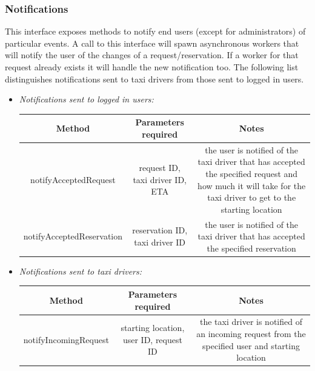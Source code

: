 \documentclass{article}
\begin{document}
\begin{itemize}
			\subsubsection{Notifications} %
			This interface exposes methods to notify end users (except for administrators) of particular events. 
			A call to this interface will spawn asynchronous workers that will notify the user of the changes of a request/reservation.
			If a worker for that request already exists it will handle the new notification too.
			The following list distinguishes notifications sent to taxi drivers from those sent to logged in users.
			\begin{itemize}
				\item \textit{Notifications sent to logged in users:} \\
					\begin{adjustbox}{width=1.2\textwidth}	
						\begin{tabular}{*{3}{c}}
							\toprule
							Method & Parameters required & Notes \\
							\midrule
							notifyAcceptedRequest & request ID, taxi driver ID, ETA & the user is notified of the taxi driver that has accepted the specified request and how much it will take for the taxi driver to get to the starting location\\ 
							notifyAcceptedReservation & reservation ID, taxi driver ID & the user is notified of the taxi driver that has accepted the specified reservation \\
							\bottomrule
						\end{tabular}
					\end{adjustbox}	
				\item \textit{Notifications sent to taxi drivers:} \\
					\begin{adjustbox}{width=1.2\textwidth}	
						\begin{tabular}{*{3}{c}}
							\toprule
							Method & Parameters required & Notes \\
							\midrule
							notifyIncomingRequest & starting location, user ID, request ID & the taxi driver is notified of an incoming request from the specified user and starting location\\ 

\end{tabular}
\end{adjustbox}
\end{itemize}
\end{itemize}
\end{document}
